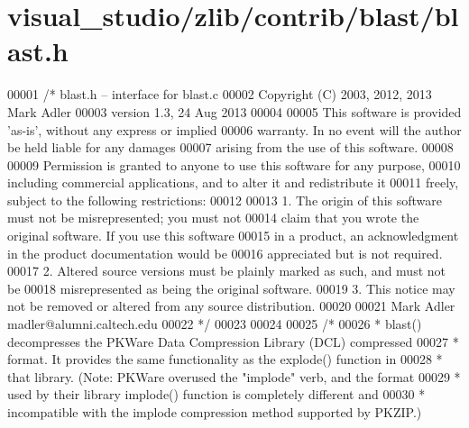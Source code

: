 \hypertarget{visual__studio_2zlib_2contrib_2blast_2blast_8h_source}{}\section{visual\+\_\+studio/zlib/contrib/blast/blast.h}
\label{visual__studio_2zlib_2contrib_2blast_2blast_8h_source}

\begin{DoxyCode}
00001 \textcolor{comment}{/* blast.h -- interface for blast.c}
00002 \textcolor{comment}{  Copyright (C) 2003, 2012, 2013 Mark Adler}
00003 \textcolor{comment}{  version 1.3, 24 Aug 2013}
00004 \textcolor{comment}{}
00005 \textcolor{comment}{  This software is provided 'as-is', without any express or implied}
00006 \textcolor{comment}{  warranty.  In no event will the author be held liable for any damages}
00007 \textcolor{comment}{  arising from the use of this software.}
00008 \textcolor{comment}{}
00009 \textcolor{comment}{  Permission is granted to anyone to use this software for any purpose,}
00010 \textcolor{comment}{  including commercial applications, and to alter it and redistribute it}
00011 \textcolor{comment}{  freely, subject to the following restrictions:}
00012 \textcolor{comment}{}
00013 \textcolor{comment}{  1. The origin of this software must not be misrepresented; you must not}
00014 \textcolor{comment}{     claim that you wrote the original software. If you use this software}
00015 \textcolor{comment}{     in a product, an acknowledgment in the product documentation would be}
00016 \textcolor{comment}{     appreciated but is not required.}
00017 \textcolor{comment}{  2. Altered source versions must be plainly marked as such, and must not be}
00018 \textcolor{comment}{     misrepresented as being the original software.}
00019 \textcolor{comment}{  3. This notice may not be removed or altered from any source distribution.}
00020 \textcolor{comment}{}
00021 \textcolor{comment}{  Mark Adler    madler@alumni.caltech.edu}
00022 \textcolor{comment}{ */}
00023 
00024 
00025 \textcolor{comment}{/*}
00026 \textcolor{comment}{ * blast() decompresses the PKWare Data Compression Library (DCL) compressed}
00027 \textcolor{comment}{ * format.  It provides the same functionality as the explode() function in}
00028 \textcolor{comment}{ * that library.  (Note: PKWare overused the "implode" verb, and the format}
00029 \textcolor{comment}{ * used by their library implode() function is completely different and}
00030 \textcolor{comment}{ * incompatible with the implode compression method supported by PKZIP.)}

\end{DoxyCode}
